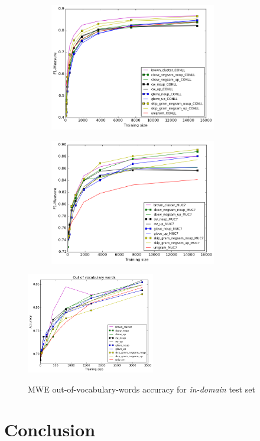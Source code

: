 \begin{figure}
\caption{NER out-of-vocabulary-words accuracy for \textit{in-domain} and \textit{out-of-domain} test sets}
\centering
\begin{subfigure}{.5\textwidth}
	\centering
    	\includegraphics[width=0.8\textwidth]{plots/NERoutOfVocIN.png}
	\label{fig:inner}
\end{subfigure}
\begin{subfigure}{.5\textwidth}
	\centering
    	\includegraphics[width=0.8\textwidth]{plots/NERoutOfVocOUT.png}
	\label{fig:outner}
\end{subfigure}  	
\end{figure}


\begin{figure}
\caption{MWE out-of-vocabulary-words accuracy for \textit{in-domain} test set}
\centering
    	\includegraphics[width=0.5\textwidth]{plots/MWEoutOfVoc.png}    
\label{fig:outmwe}
\end{figure}





\section{Conclusion}
